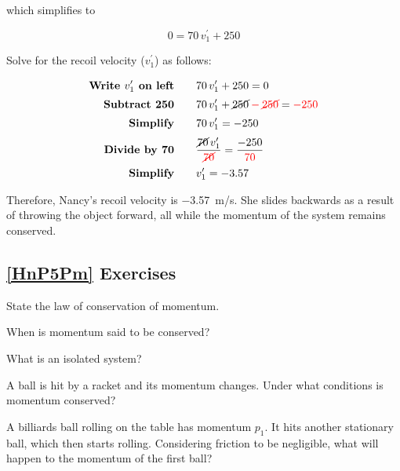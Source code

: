 \documentclass{article}
\numberwithin{equation}{section}
\numberwithin{figure}{section}
\begin{document}
 which simplifies to 

 \begin{equation*}
     0 = 70\,v_1^{\prime} + 250
 \end{equation*}

 Solve for the recoil velocity ($v_1^{\prime}$) as follows:

 \begin{align*}
     \textbf{Write $v_1^{\prime}$ on left} \qquad & 70\,v_1^{\prime} + 250 = 0\\[0.5ex]
     \textbf{Subtract 250} \qquad & 70\,v_1^{\prime} + \cancel{250} \mathbin{\color{red} - } \textcolor{red}{\cancel{250}} = \mathbin{\color{red} - } \textcolor{red}{250}\\[0.5ex]
     \textbf{Simplify} \qquad &  70\,v_1^{\prime} = -250\\[0.5ex]
     \textbf{Divide by 70} \qquad & \frac{\cancel{70}\,v_1^{\prime}}{\textcolor{red}{\cancel{70}}} = \frac{-250}{\textcolor{red}{70}}\\[0.5ex]
     \textbf{Simplify} \qquad & v_1^{\prime} = -3.57\\
 \end{align*}

Therefore, Nancy's recoil velocity is \SI{-3.57}{m/s}. She slides backwards as a result of throwing the object forward, all while the momentum of the system remains conserved.
 

\subsection*{\ref{HnP5Pm} Exercises}

\begin{exercise}
    State the law of conservation of momentum.
\end{exercise}

\begin{exercise}
    When is momentum said to be conserved?
\end{exercise}

\begin{exercise}
    What is an isolated system?
\end{exercise}

\begin{exercise}
    A ball is hit by a racket and its momentum changes. Under what conditions is momentum conserved?
\end{exercise}


\begin{exercise} \label{yEzMEO}
    A billiards ball rolling on the table has momentum $p_1$. It hits another stationary ball, which then starts rolling. Considering friction to be negligible, what will happen to the momentum of the first ball?
\end{exercise}
\end{document}

